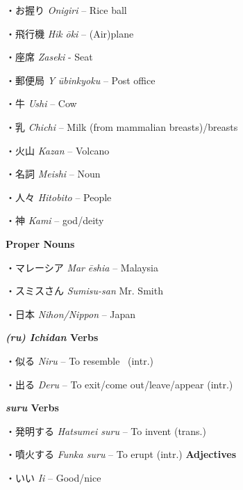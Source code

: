 \par{・お握り \emph{Onigiri }– Rice ball }

\par{・飛行機 \emph{Hik }\emph{ōki }– (Air)plane }

\par{・座席 \emph{Zaseki }- Seat }

\par{・郵便局 \emph{Y }\emph{ūbinkyoku }– Post office }

\par{・牛 \emph{Ushi }– Cow }

\par{・乳 \emph{Chichi }– Milk (from mammalian breasts)\slash breasts }

\par{・火山 \emph{Kazan }– Volcano }

\par{・名詞 \emph{Meishi }– Noun }

\par{・人々 \emph{Hitobito }– People }

\par{・神 \emph{Kami }– god\slash deity }

\par{\textbf{Proper Nouns }}

\par{・マレーシア \emph{Mar }\emph{ēshia }– Malaysia }

\par{・スミスさん \emph{Sumisu-san }Mr. Smith }

\par{・日本 \emph{Nihon\slash Nippon }– Japan }

\par{\textbf{\emph{(ru) Ichidan }Verbs }}

\par{・似る \emph{Niru }– To resemble  (intr.) }

\par{・出る \emph{Deru }– To exit\slash come out\slash leave\slash appear (intr.) }

\par{\textbf{\emph{suru }Verbs }}

\par{・発明する \emph{Hatsumei suru }– To invent (trans.) }

\par{・噴火する  \emph{Funka suru } – To erupt (intr.) }
  \textbf{Adjectives }
\par{・いい \emph{Ii }– Good\slash nice }

